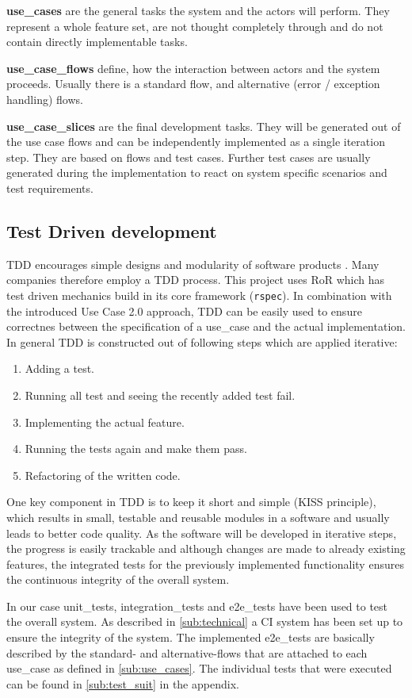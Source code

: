 \textbf{\Glspl{use_case}} are the general tasks the system and the actors will perform. They represent a whole feature set, are not thought completely through and do not contain directly implementable tasks.

\textbf{\Glspl{use_case_flow}} define, how the interaction between actors and the system proceeds. Usually there is a standard flow, and alternative (error / exception handling) flows. 

\textbf{\Glspl{use_case_slice}} are the final development tasks. They will be generated out of the use case flows and can be independently implemented as a single iteration step. They are based on flows and test cases. Further test cases are usually generated during the implementation to react on system specific scenarios and test requirements.


\subsection{Test Driven development}
\label{sec:tdd}
\Gls{TDD} encourages simple designs and modularity of software products \cite{tdd}. Many companies therefore employ a \gls{TDD} process. This project uses \gls{RoR} which has test driven mechanics build in its core framework (\texttt{rspec}). In combination with the introduced Use Case 2.0 approach, \gls{TDD} can be easily used to ensure correctnes between the specification of a \gls{use_case} and the actual implementation. In general \gls{TDD} is constructed out of following steps which are applied iterative: 

\begin{enumerate}
	\item Adding a test.
	\item Running all test and seeing the recently added test fail.
	\item Implementing the actual feature.
	\item Running the tests again and make them pass.
	\item Refactoring of the written code.
\end{enumerate}


One key component in \gls{TDD} is to keep it short and simple (KISS principle), which results in small, testable and reusable modules in a software and usually leads to better code quality. As the software will be developed in iterative steps, the progress is easily trackable and although changes are made to already existing features, the integrated tests for the previously implemented functionality ensures the continuous integrity of the overall system.  

In our case \glspl{unit_test}, \glspl{integration_test} and \glspl{e2e_test} have been used to test the overall system. As described in \autoref{sub:technical} a \gls{CI} system has been set up to ensure the integrity of the system. The implemented \glspl{e2e_test} are basically described by the standard- and alternative-flows that are attached to each \gls{use_case} as defined in \autoref{sub:use_cases}. The individual tests that were executed can be found in \autoref{sub:test_suit} in the appendix.


